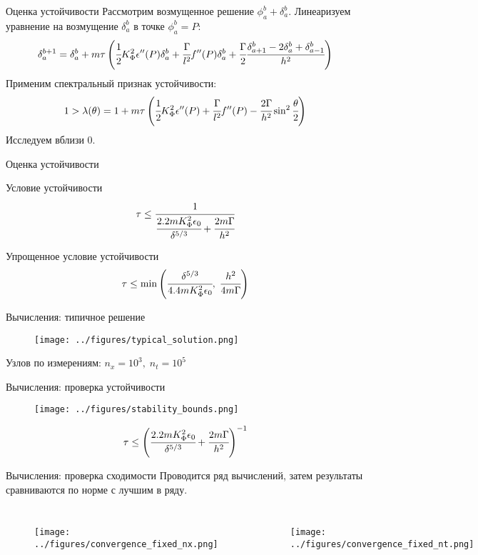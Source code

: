 \documentclass{beamer}
\begin{document}
\begin{frame}{Оценка устойчивости}
Рассмотрим возмущенное решение $\phi_a^b + \delta_a^b$. Линеаризуем уравнение на возмущение
$\delta_a^b$ в точке $\phi_a^b = P$:
$$\delta_a^{b + 1} = \delta_a^b + m \tau \left( \cfrac{1}{2} K_\Phi^2 \epsilon''(P) \delta_a^b +
\cfrac{\Gamma}{l^2} f''(P) \delta_a^b + \cfrac{\Gamma}{2} \cfrac{\delta_{a + 1}^b - 2 \delta_a^b +
\delta_{a - 1}^b}{h^2} \right)$$
Применим спектральный признак устойчивости:
$$1 > \lambda(\theta) = 1 + m \tau \left( \cfrac{1}{2} K_\Phi^2 \epsilon''(P) +
\cfrac{\Gamma}{l^2} f''(P) - \cfrac{2 \Gamma}{h^2} \sin^2 \cfrac{\theta}{2} \right)$$
Исследуем вблизи $0$.
\end{frame}


\begin{frame}{Оценка устойчивости}
\begin{block}{Условие устойчивости}
	$$\tau \leq \cfrac{1}{\cfrac{2.2 m K_\Phi^2 \epsilon_0}{\delta^{5/3}} +
	\cfrac{2m \Gamma}{h^2}}$$
\end{block}
\begin{block}{Упрощенное условие устойчивости}
	$$\tau \leq \min \left(\cfrac{\delta^{5/3}}{4.4 m K_\Phi^2 \epsilon_0}, \;
	\cfrac{h^2}{4m \Gamma} \right)$$
\end{block}
\end{frame}


\begin{frame}{Вычисления: типичное решение}
\begin{figure}
	\texttt{[image: ../figures/typical\_solution.png]}
\end{figure}
\vspace{-0.8cm}
\begin{center}
	Узлов по измерениям: $n_x = 10^3, \; n_t = 10^5$
\end{center}
\end{frame}


\begin{frame}{Вычисления: проверка устойчивости}
\vspace{-0.5cm}
\begin{figure}
	\texttt{[image: ../figures/stability\_bounds.png]}
\end{figure}
\vspace{-0.3cm}
$$\tau \leq \left( \cfrac{2.2 m K_\Phi^2 \epsilon_0}{\delta^{5/3}} +
\cfrac{2m \Gamma}{h^2} \right)^{-1}$$
\end{frame}


\begin{frame}{Вычисления: проверка сходимости}
Проводится ряд вычислений, затем результаты сравниваются по норме с лучшим в ряду.
\begin{columns}
\begin{figure}
	\texttt{[image: ../figures/convergence\_fixed\_nx.png]}
\end{figure}
\begin{figure}
	\texttt{[image: ../figures/convergence\_fixed\_nt.png]}
\end{figure}
\end{columns}
\end{frame}
\end{document}

